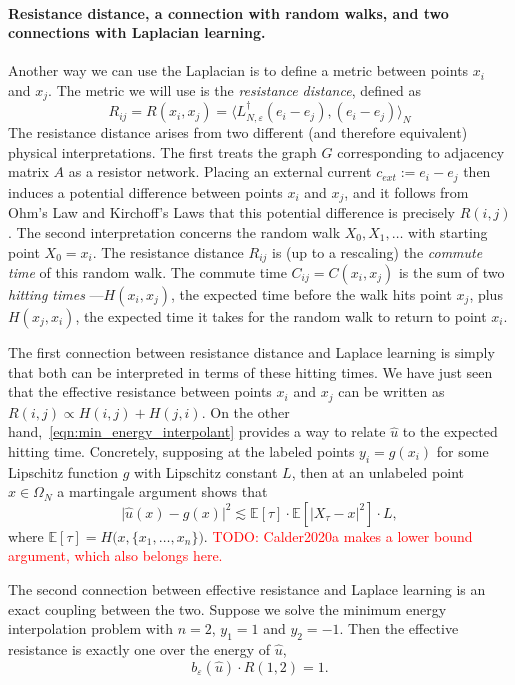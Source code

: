 \documentclass{article}
\newcommand{\1}{\mathbf{1}}
\newcommand{\Ebb}{\mathbb{E}}
\newcommand{\wh}[1]{\widehat{#1}}
\theoremstyle{definition}
\theoremstyle{remark}
\begin{document}
\paragraph{Resistance distance, a connection with random walks, and two connections with Laplacian learning.}
Another way we can use the Laplacian is to define a metric between points $x_i$ and $x_j$. The metric we will use is the \emph{resistance distance}, defined as 
\begin{equation*}
R_{ij} = R(x_i,x_j) = \bigl \langle L_{N,\varepsilon}^{\dagger}(e_i - e_j),(e_i - e_j)\bigr \rangle_N
\end{equation*}
The resistance distance arises from two different (and therefore equivalent) physical interpretations. The first treats the graph $G$ corresponding to adjacency matrix $A$ as a resistor network. Placing an external current $c_{ext} := e_i - e_j$ then induces a potential difference between points $x_i$ and $x_j$, and it follows from Ohm's Law and Kirchoff's Laws that this potential difference is precisely $R(i,j)$. The second interpretation concerns the random walk $X_0,X_1,\ldots$ with starting point $X_0 = x_i$. The resistance distance $R_{ij}$ is (up to a rescaling) the \emph{commute time} of this random walk. The commute time $C_{ij} = C(x_i,x_j)$ is the sum  of two \emph{hitting times}
---$H(x_i,x_j)$, the expected time before the walk hits point $x_j$, plus $H(x_j,x_i)$, the expected time it takes for the random walk to return to point $x_i$. 

The first connection between resistance distance and Laplace learning is simply that both can be interpreted in terms of these hitting times. We have just seen that the effective resistance between points $x_i$ and $x_j$ can be written as $R(i,j) \propto H(i,j) + H(j,i)$. On the other hand,~\eqref{eqn:min_energy_interpolant} provides a way to relate $\wh{u}$ to the expected hitting time. Concretely, supposing at the labeled points $y_i = g(x_i)$ for some Lipschitz function $g$ with Lipschitz constant $L$, then at an unlabeled point $x \in \Omega_N$ a martingale argument shows that
\begin{equation*}
\bigl|\wh{u}(x) - g(x)\bigr|^2 \lesssim \Ebb[\tau] \cdot \Ebb[|X_{\tau} - x|^2]  \cdot L,
\end{equation*}
where $\Ebb[\tau] = H\bigl(x,\{x_1,\ldots,x_n\}\bigr)$. \textcolor{red}{TODO: Calder2020a makes a lower bound argument, which also belongs here.}

The second connection between effective resistance and Laplace learning is an exact coupling between the two. Suppose we solve the minimum energy interpolation problem with $n = 2$, $y_1 = 1$ and $y_2 = -1$. Then the effective resistance is exactly one over the energy of $\wh{u}$,
\begin{equation*}
b_{\varepsilon}(\wh{u}) \cdot R(1,2) = 1.
\end{equation*}
\end{document}
